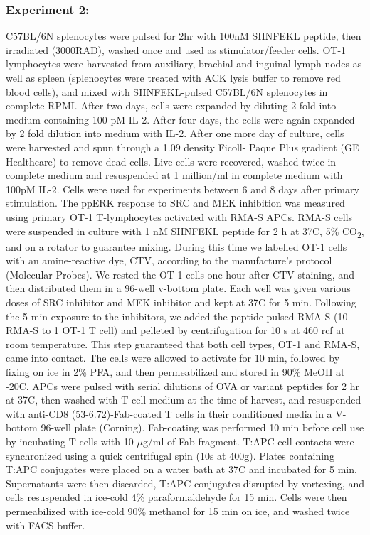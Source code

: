 \documentclass[11pt,a4paper,draft]{article}
\begin{document}
\subsubsection*{Experiment 2:} C57BL/6N splenocytes were pulsed for 2hr with 100nM SIINFEKL peptide, then irradiated (3000RAD), washed once and used as stimulator/feeder cells. OT-1 lymphocytes were harvested from auxiliary, brachial and inguinal lymph nodes as well as spleen (splenocytes were treated with ACK lysis buffer to remove red blood cells), and mixed with SIINFEKL-pulsed C57BL/6N splenocytes in complete RPMI. After two days, cells were expanded by diluting 2 fold into medium containing 100 pM IL-2. After four days, the cells were again expanded by 2 fold dilution into medium with IL-2. After one more day of culture, cells were harvested and spun through a 1.09 density Ficoll- Paque Plus gradient (GE Healthcare) to remove dead cells. Live cells were recovered, washed twice in complete medium and resuspended at 1 million/ml in complete medium with 100pM IL-2. Cells were used for experiments between 6 and 8 days after primary stimulation. The ppERK response to SRC and MEK inhibition was measured using primary OT-1 T-lymphocytes activated with RMA-S APCs. RMA-S cells were suspended in culture with 1 nM SIINFEKL peptide for 2 h at 37C, 5\% CO\textsubscript{2}, and on a rotator to guarantee mixing. During this time we labelled OT-1 cells with an amine-reactive dye, CTV, according to the manufacture’s protocol (Molecular Probes). We rested the OT-1 cells one hour after CTV staining, and then distributed them in a 96-well v-bottom plate. Each well was given various doses of SRC inhibitor and MEK inhibitor and kept at 37C for 5 min. Following the 5 min exposure to the inhibitors, we added the peptide pulsed RMA-S (10 RMA-S to 1 OT-1 T cell) and pelleted by centrifugation for 10 s at 460 rcf at room temperature. This step guaranteed that both cell types, OT-1 and RMA-S, came into contact. The cells were allowed to activate for 10 min, followed by fixing on ice in 2\% PFA, and then permeabilized and stored in 90\% MeOH at  -20C. APCs were pulsed with serial dilutions of OVA or variant peptides for 2 hr at 37C, then washed with T cell medium at the time of harvest, and resuspended with anti-CD8 (53-6.72)-Fab-coated T cells in their conditioned media in a V-bottom 96-well plate (Corning). Fab-coating was performed 10 min before cell use by incubating T cells with 10 $\mu$g/ml of Fab fragment. T:APC cell contacts were synchronized using a quick centrifugal spin (10s at 400g). Plates containing T:APC conjugates were placed on a water bath at 37C and incubated for 5 min. Supernatants were then discarded, T:APC conjugates disrupted by vortexing, and cells resuspended in ice-cold 4\% paraformaldehyde for 15 min. Cells were then permeabilized with ice-cold 90\% methanol for 15 min on ice, and washed twice with FACS buffer. 
\end{document}
